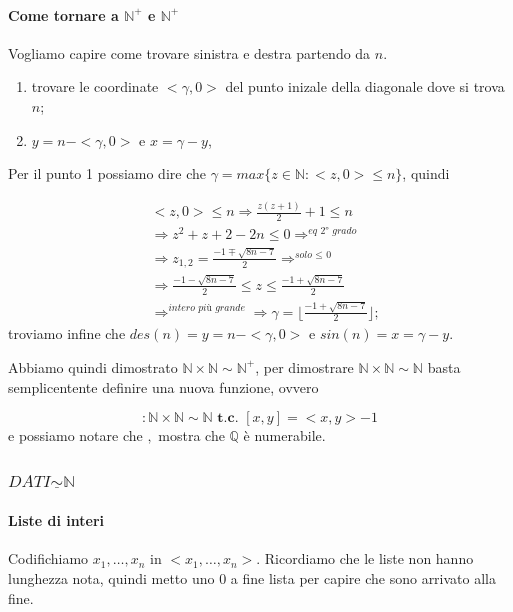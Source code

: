 \documentclass{article}
\begin{document}
\paragraph{Come tornare a $\mathbb{N}^{+}$ e $\mathbb{N}^{+}$}
Vogliamo capire come trovare sinistra e destra partendo da $n$.
\begin{enumerate}
	\item trovare le coordinate $<\gamma,0> $ del punto inizale della diagonale dove si trova $n$;
	\item $y = n - <\gamma, 0>$ e $x= \gamma -y$,
\end{enumerate}

Per il punto 1 possiamo dire che $\gamma = \textit{max} \{ z \in \mathbb{N} : <z,0> \leq n \} $, quindi

\begin{displaymath}
	\begin{split}
	& <z,0> \leq n \Rightarrow \frac{z(z+1)}{2}+1 \leq n \\ 
	& \Rightarrow z^2 +z+2-2n \leq 0 \Rightarrow^{\textit{eq 2° grado}} \\
	& \Rightarrow z_{1,2}=\frac{-1 \mp \sqrt{8n-7} }{2} \Rightarrow^{\textit{solo $\leq$ 0}} \\
	& \Rightarrow  \frac{-1 - \sqrt{8n-7} }{2} \leq z \leq \frac{-1 + \sqrt{8n-7} }{2} \\
	& \Rightarrow^{\textit{intero più grande}} \Rightarrow \gamma = \lfloor \frac{-1 + \sqrt{8n-7} }{2} \rfloor;
	\end{split}
\end{displaymath}
 troviamo infine che $ \textit{des}(n)=y=n-<\gamma,0> $ e $\textit{sin}(n)=x=\gamma-y$.
 
 
 Abbiamo quindi dimostrato $ \mathbb{N} \times \mathbb{N} \sim \mathbb{N}^{+} $, per dimostrare $ \mathbb{N} \times \mathbb{N} \sim \mathbb{N} $ basta semplicentente definire una nuova funzione, ovvero
 
 \begin{displaymath}
 	[,]: \mathbb{N} \times \mathbb{N} \sim \mathbb{N} \textbf{ t.c. } [x,y] = <x,y> -1
 \end{displaymath}
 e possiamo notare che ${,}$ mostra che $\mathbb{Q}$ è numerabile.
 
 \subsubsection{$\textit{DATI} \underline{\sim} \mathbb{N}$}
\paragraph{Liste di interi}
Codifichiamo $x_1, \dots, x_n$ in $<x_1, \dots, x_n>$. Ricordiamo che le liste non hanno lunghezza nota, quindi metto uno $0$ a fine lista per capire che sono arrivato alla fine.
\end{document}
